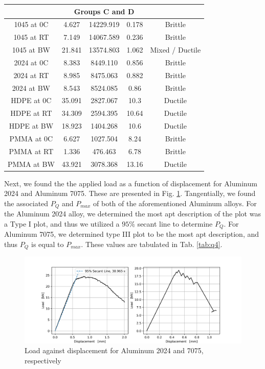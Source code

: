 \documentclass{article}
\begin{document}
\begin{table}[!h!]
\begin{tabular}{|c|c|c|c|c|}
        \bottomrule
        \multicolumn{5}{|c|}{Groups C and D} \\
        \toprule
        \bottomrule
        1045 at 0C & 4.627 & 14229.919 & 0.178 & Brittle\\ 
        \hline
        1045 at RT & 7.149 & 14067.589 & 0.236 & Brittle \\ 
        \hline
        1045 at BW & 21.841 & 13574.803 & 1.062 & Mixed / Ductile\\ 
        \hline
        2024 at 0C & 8.383 & 8449.110 & 0.856 & Brittle\\ 
        \hline
        2024 at RT & 8.985 & 8475.063 & 0.882 & Brittle\\ 
        \hline
        2024 at BW & 8.543 & 8524.085 & 0.86 & Brittle\\ 
        \hline
        HDPE at 0C & 35.091 & 2827.067 & 10.3 & Ductile \\ 
        \hline
        HDPE at RT & 34.309 & 2594.395 & 10.64 & Ductile\\ 
        \hline
        HDPE at BW & 18.923 & 1404.268 & 10.6 & Ductile \\ 
        \hline
        PMMA at 0C & 6.627 & 1027.504 & 8.24 & Brittle\\ 
        \hline
        PMMA at RT & 1.336 & 476.463 & 6.78 & Brittle\\ 
        \hline
        PMMA at BW & 43.921 & 3078.368 & 13.16 & Ductile\\ 
        \toprule
    \end{tabular}
    \label{tab:q2}
\end{table}

\newpage

Next, we found the the applied load as a function of displacement for Aluminum 2024 and Aluminum 7075. These are presented in Fig. \ref{fig:q4}. Tangentially, we found the associated $P_Q$ and $P_{max}$ of both of the aforementioned Aluminum alloys. For the Aluminum 2024 alloy, we determined the most apt description of the plot was a Type I plot, and thus we utilized a $95\%$ secant line to determine $P_Q$. For Aluminum 7075, we determined type III plot to be the most apt description, and thus $P_Q$ is equal to $P_{max}$. These values are tabulated in Tab. \ref{tab:q4}.

\begin{figure}[!h!]
    \centering
    \includegraphics[width=\linewidth]{Lab6/plots/q4.png}
    \caption{Load against displacement for Aluminum 2024 and 7075, respectively}
    \label{fig:q4}
\end{figure}
\end{document}
